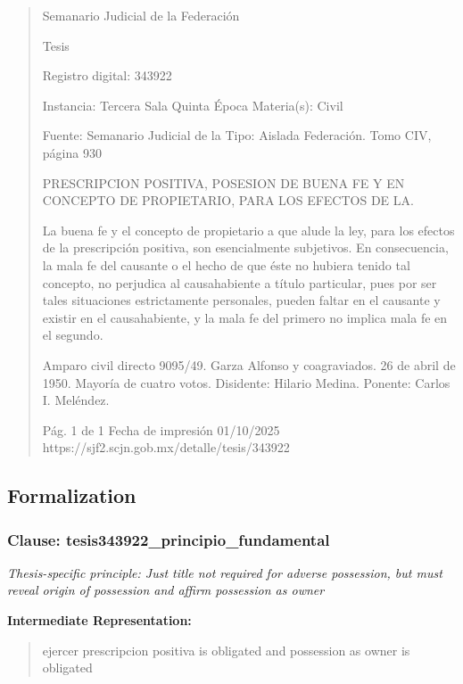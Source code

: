 \documentclass[11pt,a4paper]{article}
\begin{document}
\begin{quote}
                                                   Semanario Judicial de la Federación

                                                  Tesis

 Registro digital: 343922

 Instancia: Tercera Sala          Quinta Época                         Materia(s): Civil

                                  Fuente: Semanario Judicial de la     Tipo: Aislada
                                  Federación.
                                  Tomo CIV, página 930


PRESCRIPCION POSITIVA, POSESION DE BUENA FE Y EN CONCEPTO DE PROPIETARIO,
PARA LOS EFECTOS DE LA.


La buena fe y el concepto de propietario a que alude la ley, para los efectos de la prescripción
positiva, son esencialmente subjetivos. En consecuencia, la mala fe del causante o el hecho de que
éste no hubiera tenido tal concepto, no perjudica al causahabiente a título particular, pues por ser
tales situaciones estrictamente personales, pueden faltar en el causante y existir en el
causahabiente, y la mala fe del primero no implica mala fe en el segundo.


Amparo civil directo 9095/49. Garza Alfonso y coagraviados. 26 de abril de 1950. Mayoría de cuatro
votos. Disidente: Hilario Medina. Ponente: Carlos I. Meléndez.




                                             Pág. 1 de 1             Fecha de impresión 01/10/2025
  https://sjf2.scjn.gob.mx/detalle/tesis/343922

\end{quote}

\subsection{Formalization}

\subsubsection{Clause: tesis343922\_principio\_fundamental}

\textit{Thesis-specific principle: Just title not required for adverse possession, but must reveal origin of possession and affirm possession as owner}

\textbf{Intermediate Representation:}

\begin{quote}
ejercer prescripcion positiva is obligated and possession as owner is obligated
\end{quote}
\end{document}
